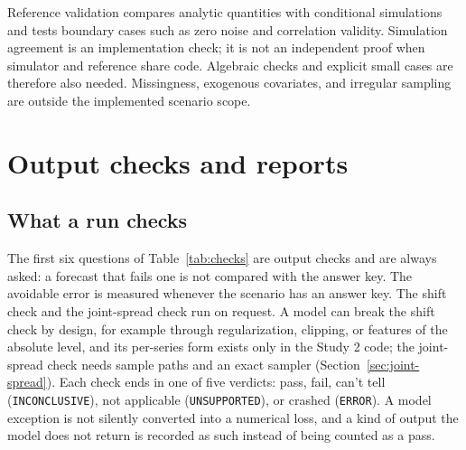 \documentclass[11pt,a4paper]{article}
\newcommand{\code}[1]{\texttt{#1}}
\begin{document}
Reference validation compares analytic quantities with conditional
simulations and tests boundary cases such as zero noise and correlation
validity. Simulation agreement is an implementation check; it is not an
independent proof when simulator and reference share code. Algebraic
checks and explicit small cases are therefore also needed. Missingness,
exogenous covariates, and irregular sampling are outside the implemented
scenario scope.

\section{Output checks and reports}
\label{sec:contracts}

\subsection{What a run checks}

The first six questions of Table~\ref{tab:checks} are output checks and are always asked: a forecast that
fails one is not compared with the answer key. The avoidable error is
measured whenever the scenario has an answer key. The shift check and the
joint-spread check run on request. A model can break the shift check by
design, for example through regularization, clipping, or features of the
absolute level, and its per-series form exists only in the Study 2 code;
the joint-spread check needs sample paths and an exact sampler
(Section~\ref{sec:joint-spread}). Each check
ends in one of five verdicts: pass, fail, can't tell
(\code{INCONCLUSIVE}), not applicable (\code{UNSUPPORTED}), or crashed
(\code{ERROR}). A model exception is not silently converted into a
numerical loss, and a kind of output the model does not return is
recorded as such instead of being counted as a pass.
\end{document}
